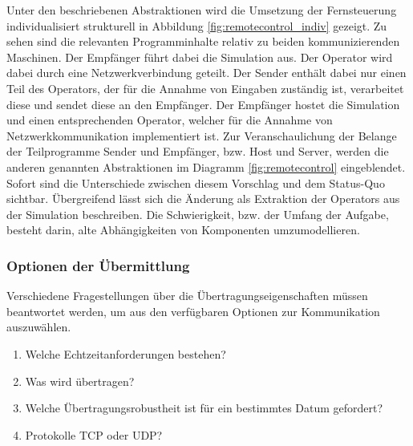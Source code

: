 Unter den beschriebenen Abstraktionen wird die Umsetzung der Fernsteuerung individualisiert strukturell in Abbildung \ref{fig:remotecontrol_indiv} gezeigt. 
Zu sehen sind die relevanten Programminhalte relativ zu beiden kommunizierenden Maschinen.
Der Empfänger führt dabei die Simulation aus. Der Operator wird dabei durch eine Netzwerkverbindung geteilt.
Der Sender enthält dabei nur einen Teil des Operators, der für die Annahme von Eingaben zuständig ist, verarbeitet diese und sendet diese an den Empfänger.
Der Empfänger hostet die Simulation und einen entsprechenden Operator, welcher für die Annahme von Netzwerkkommunikation implementiert ist.
Zur Veranschaulichung der Belange der Teilprogramme Sender und Empfänger, bzw. Host und Server, werden die anderen genannten Abstraktionen im Diagramm \ref{fig:remotecontrol} eingeblendet.
Sofort sind die Unterschiede zwischen diesem Vorschlag und dem Status-Quo sichtbar.
Übergreifend lässt sich die Änderung als Extraktion der Operators aus der Simulation beschreiben. Die Schwierigkeit, bzw. der Umfang der Aufgabe, besteht darin, alte Abhängigkeiten von Komponenten umzumodellieren.\\

\subsubsection{Optionen der Übermittlung}
Verschiedene Fragestellungen über die Übertragungseigenschaften müssen beantwortet werden, um aus den verfügbaren Optionen zur Kommunikation auszuwählen.\\

\begin{enumerate}
\item Welche Echtzeitanforderungen bestehen?
\item Was wird übertragen?
\item Welche Übertragungsrobustheit ist für ein bestimmtes Datum gefordert?
\item Protokolle TCP oder UDP?
\end{enumerate}


